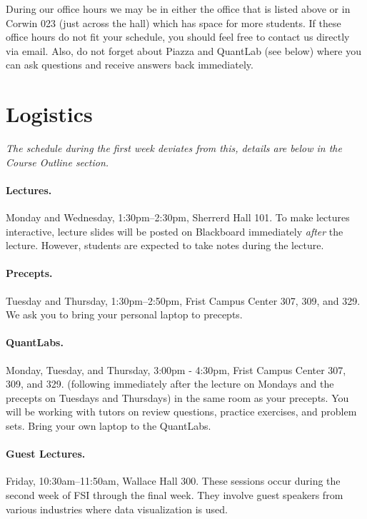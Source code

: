 \documentclass[11pt,letterpaper]{article}
\begin{document}
During our office hours we may be in either the office that is listed above or
in Corwin 023 (just across the hall) which has space for more students. If these
office hours do not fit your schedule, you should feel free to contact us
directly via email.  Also, do not forget about Piazza and QuantLab (see below)
where you can ask questions and receive answers back immediately.

\section*{Logistics}

\textit{The schedule during the first week deviates from this, details
  are below in the Course Outline section.}

\paragraph{Lectures.} Monday and Wednesday, 1:30pm--2:30pm, Sherrerd
Hall 101. To make lectures interactive, lecture slides will be posted
on Blackboard immediately {\it after} the lecture.  However, students
are expected to take notes during the lecture.

\paragraph{Precepts.} Tuesday and Thursday, 1:30pm--2:50pm, Frist
Campus Center 307, 309, and 329.  We ask you to bring your personal
laptop to precepts.

\paragraph{QuantLabs.} Monday, Tuesday, and Thursday, 3:00pm - 4:30pm,
Frist Campus Center 307, 309, and 329.  (following immediately after
the lecture on Mondays and the precepts on Tuesdays and Thursdays) in
the same room as your precepts.  You will be working with tutors on
review questions, practice exercises, and problem sets.  Bring your
own laptop to the QuantLabs.

\paragraph{Guest Lectures.} Friday, 10:30am--11:50am, Wallace Hall
300. These sessions occur during the second week of FSI through the
final week.  They involve
guest speakers from various industries where data visualization is
used.  
\end{document}
